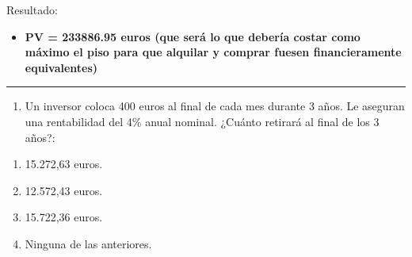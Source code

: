 \documentclass[
  letterpaper,
  DIV=11,
  numbers=noendperiod]{scrreprt}
\providecommand{\tightlist}{%
  \setlength{\itemsep}{0pt}\setlength{\parskip}{0pt}}\usepackage{longtable,booktabs,array}
\begin{document}
\begin{tcolorbox}[enhanced jigsaw, left=2mm, opacityback=0, colback=white, breakable, arc=.35mm, bottomrule=.15mm, rightrule=.15mm, toprule=.15mm, leftrule=.75mm, colframe=quarto-callout-tip-color-frame]
\begin{minipage}[t]{\textwidth - 5.5mm}
Resultado:

\begin{itemize}
\tightlist
\item
  \textbf{PV = 233886.95 euros (que será lo que debería costar como
  máximo el piso para que alquilar y comprar fuesen financieramente
  equivalentes)}
\end{itemize}

\end{minipage}%
\end{tcolorbox}

\begin{center}\rule{0.5\linewidth}{0.5pt}\end{center}

\begin{enumerate}
\def\labelenumi{\arabic{enumi}.}
\setcounter{enumi}{36}
\tightlist
\item
  Un inversor coloca 400 euros al final de cada mes durante 3 años. Le
  aseguran una rentabilidad del 4\% anual nominal. ¿Cuánto retirará al
  final de los 3 años?:
\end{enumerate}

\begin{enumerate}
\def\labelenumi{\alph{enumi})}
\item
  15.272,63 euros.
\item
  12.572,43 euros.
\item
  15.722,36 euros.
\item
  Ninguna de las anteriores.
\end{enumerate}
\end{document}
